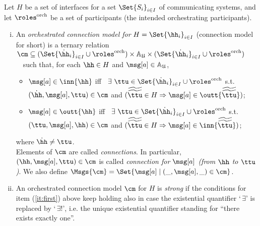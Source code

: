 \begin{definition}\label{def:cm}
Let $H$ be a set of interfaces for a set $\Set{S_i}_{i\in I}$ of communicating systems,
and let $\roles^{\mathrm{orch}}$ be a set of participants (the intended orchestrating participants).
 
 \begin{enumerate}[i)]
 \item
 An {\em  orchestrated connection model for} $H=\Set{\hh_i}_{i\in I}$ (connection model for short) is a ternary relation\  \
 $\cm\subseteq (\Set{\dot\hh_i}_{i\in I}\cup\roles^{\mathrm{orch}})\times\mathbb{A}_\mathfrak{U}\times (\Set{\dot\hh_i}_{i\in I}\cup\roles^{\mathrm{orch}})$\ \
 such that,   for each $\hh\in H$  and $\msg[a] \in \mathbb{A}_\mathfrak{U}$, 
  \begin{itemize}
 \item
 \label{it:first}
 $\msg[a]\in\inn{\hh}$ iff~ $\exists\ \ttu\in \Set{\dot\hh_i}_{i\in I}\cup\roles^{\mathrm{orch}}$ s.t. 
 $(\dot\hh, \msg[a],\ttu)\in \cm$ and $(\widetilde{\widetilde\ttu}\in H \Rightarrow\msg[a]\in\outt{\widetilde{\widetilde\ttu}})$;
 
 \item
 $\msg[a]\in\outt{\hh}$ iff~ $\exists\ \ttu\in \Set{\dot\hh_i}_{i\in I}\cup\roles^{\mathrm{orch}}$ s.t. $(\ttu, \msg[a],\hh)\in \cm$ and
 $(\widetilde{\widetilde\ttu}\in H \Rightarrow \msg[a]\in\inn{\widetilde{\widetilde\ttu}})$;
 \end{itemize}
 
 where  $\dot\hh\neq\ttu$. \\
% 
% 
% 
 Elements of $\cm$ are called {\em connections}. In particular,
 $(\hh, \msg[a],\ttu)\in \cm$ is called {\em connection for $\msg[a]$ (from  $\hh$ to $\ttu$)}.
 We also define $\Msgs{\cm}=\Set{\msg[a] \mid (\_, \msg[a],\_)\in \cm}$.
 \item
 An orchestrated connection model $\cm$ for $H$ is {\em strong\/} if the conditions for
 item (\ref{it:first}) above keep holding also in case the existential quantifier `\,$\exists$'
 is replaced by `\,$\exists!$', i.e. the unique existential quantifier 
standing for ``there exists exactly one''.
 \end{enumerate}
 \end{definition}

